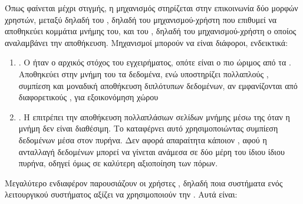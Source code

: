 Όπως φαίνεται μέχρι στιγμής, η μηχανισμός  στηρίζεται
στην επικοινωνία δύο μορφών χρηστών, μεταξύ δηλαδή του
, δηλαδή του μηχανισμού-χρήστη που επιθυμεί να αποθηκεύει
κομμάτια μνήμης του, και του , δηλαδή του μηχανισμού-χρήστη ο
οποίος αναλαμβάνει την αποθήκευση. Μηχανισμοί  μπορούν να
είναι διάφοροι, ενδεικτικά:

\begin{enumerate}
  \item {}. Ο  ήταν
  ο αρχικός στόχος του εγχειρήματος, οπότε είναι ο πιο
  ώριμος από τα . Αποθηκεύει στην μνήμη του 
  τα δεδομένα, ενώ υποστηρίζει πολλαπλούς , συμπίεση
  και μοναδική αποθήκευση διπλότυπων δεδομένων, αν εμφανίζονται
  από διαφορετικούς , για εξοικονόμηση χώρου

  \item {}. Η  επιτρέπει την αποθήκευση πολλαπλάσιων
  σελίδων μνήμης μέσω της  όταν η μνήμη δεν είναι διαθέσιμη.
  Το καταφέρνει αυτό χρησιμοποιώντας συμπίεση δεδομένων μέσα
  στον πυρήνα. Δεν αφορά απαραίτητα κάποιον , αφού η
  ανταλλαγή δεδομένων μπορεί να γίνεται ανάμεσα σε δύο μέρη του ίδιου ίδιου
  πυρήνα, οδηγεί όμως σε καλύτερη αξιοποίηση των πόρων\cite{tmemNutshell}.

\end{enumerate}

Μεγαλύτερο ενδιαφέρον παρουσιάζουν οι χρήστες , δηλαδή
ποια συστήματα ενός λειτουργικού συστήματος αξίζει να χρησιμοποιούν
την . Αυτά είναι:

